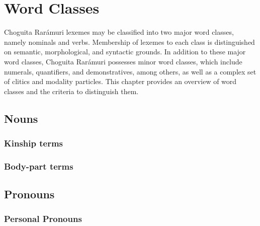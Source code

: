 \chapter{Word Classes}
\label{chap: word classes}

Choguita Rarámuri lexemes may be classified into two major word classes, namely nominals and verbs. Membership of lexemes to each class is distinguished on semantic, morphological, and syntactic grounds. In addition to these major word classes, Choguita Rarámuri possesses minor word classes, which include numerals, quantifiers, and demonstratives, among others, as well as a complex set of clitics and modality particles. This chapter provides an overview of word classes and the criteria to distinguish them.

\section{Nouns}
\label{sec:22:nominals}


\subsection{Kinship terms}
\label{subsec:22:kinship terms}

\subsection{Body-part terms}
\label{subsec:22:body-part terms}

\section{Pronouns}
\label{sec:22:pronouns}

\subsection{Personal Pronouns}
\label{subsec:22:personal pronouns}




